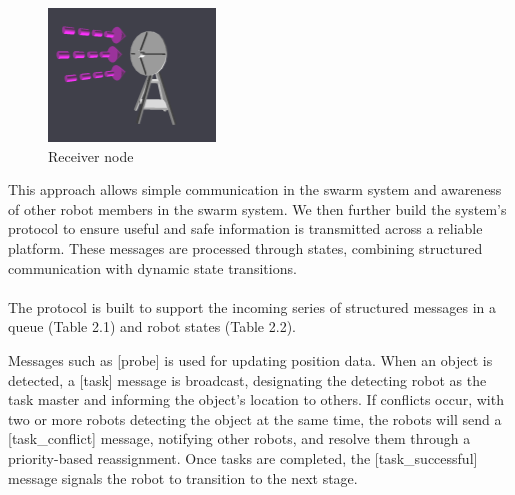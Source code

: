 \begin{figure}[!htb]
        \includegraphics[width=\linewidth]{assets/images/communication/devices/receiver.png}
        \caption{Receiver node}\label{fig:Receiver}
    \endminipage
\end{figure}

This approach allows simple communication in the swarm system and awareness of other robot members in the swarm system. We then further build the system's protocol to ensure useful and safe information is transmitted across a reliable platform. These messages are processed through states, combining structured communication with dynamic state transitions. 

\paragraph*{}
The protocol is built to support the incoming series of structured messages in a queue (Table 2.1) and robot states (Table 2.2).

Messages such as [probe] is used for updating position data. When an object is detected, a [task] message is broadcast, designating the detecting robot as the task master and informing the object's location to others. If conflicts occur, with two or more robots detecting the object at the same time, the robots will send a [task\_conflict] message, notifying other robots, and resolve them through a priority-based reassignment. Once tasks are completed, the [task\_successful] message signals the robot to transition to the next stage.


